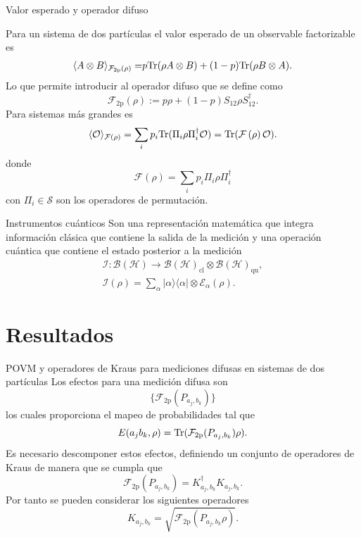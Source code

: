 \documentclass[svgnames,12pt,aspectratio=149]{beamer}
\newcommand{\ra}{\rangle}
\newcommand{\la}{\langle}
\newcommand{\rala}{\rangle\langle}
\newcommand{\tr}{{\rm Tr}}
\newcommand{\E}{\mathcal{E}}
\newcommand{\tensor}{\otimes}
\newcommand{\fuzzy}[1]{\mathcal{F}\left(#1\right)}
\newcommand{\permut}[2]{\Pi_{#1}#2\Pi_{#1}^{\dagger}}
\begin{document}
\begin{frame}{Valor esperado y operador difuso}

 
Para un sistema de dos partículas el valor esperado de un observable factorizable es 
\begin{equation*}\label{eq:Expected-Value-FM-2p}
    \begin{split}
      \la {A\otimes B}\ra_{\mathcal{F}_{2\text{p}}(\rho)} =&p\tr(\rho A\tensor B)+(1-p)\tr(\rho B\otimes A).\\
    \end{split}
\end{equation*}Lo que permite introducir al operador difuso que se define como \begin{equation*}\label{eq:op_F2p}
    \mathcal{F}_{2\text{p}}(\rho):=p\rho + (1-p)S_{12}\rho S_{12}^{\dagger}.
\end{equation*}
Para sistemas más grandes es 
\begin{equation*}\label{eq:expected-value-fm-general}
    \la \mathcal{O}\ra_{\fuzzy{\rho}}=\sum_{i}p_i\tr(\permut{i}{\rho}\mathcal{O}) =\tr(\fuzzy{\rho}\mathcal{O}).
\end{equation*} donde \begin{equation*}\label{eq:fuzzy-op-nparticles}
    \fuzzy{\rho}=\sum_{i}p_{i}\permut{i}{\rho}
 \end{equation*} con $\Pi_i \in \mathcal{S}$ son los operadores de permutación.

\end{frame}

\begin{frame}{Instrumentos cuánticos}
  Son una representación matemática que integra información clásica que contiene la salida de la medición y una operación cuántica que contiene el estado posterior a la medición \begin{equation*}
    \begin{split}
        \mathcal{I}: \mathcal{B(H)}\rightarrow\mathcal{B(H)}_{\text{cl}}\otimes \mathcal{B(H)}_{\text{qu}},\\
    \mathcal{I}(\rho)=\sum_\alpha |\alpha\rala\alpha|\otimes \E_\alpha(\rho).
    \end{split}
\end{equation*}
\end{frame}


\section{Resultados}
\begin{frame}{POVM y operadores de Kraus para mediciones difusas en sistemas de dos partículas}
  Los efectos para una medición difusa son \[\{\mathcal{F}_{2\text{p}}(P_{a_j,b_k})\}\]los cuales proporciona el mapeo de probabilidades tal que \[   E(a_j b_k, \rho)= \tr(\mathcal{F}_{2\text{p}}({P_{a_j,b_k}})\rho).\] Es necesario descomponer estos efectos, definiendo un conjunto de operadores de Kraus de manera que se cumpla que \[\mathcal{F}_{2\text{p}}(P_{a_j,b_k})=K_{a_j,b_k}^\dagger K_{a_j,b_k}.\] Por tanto se pueden considerar los siguientes operadores \[K_{a_j,b_k}=\sqrt{\mathcal{F}_{2\text{p}}(P_{a_j,b_k}\rho)}.\]
\end{frame}
\end{document}
